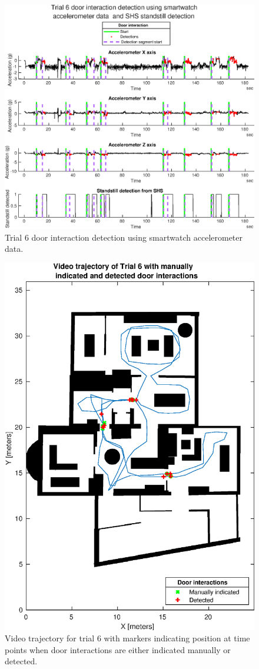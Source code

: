 \begin{figure}[H]
	\centering
	\includegraphics[width=0.8\linewidth]{images/20201201_1506_Trial_6_door_interaction_detection_using_smartwatch_1}
	\setlength{\belowcaptionskip}{-20pt}
	\caption{Trial 6 door interaction detection using smartwatch accelerometer data.}
	\label{fig:202011292141trial6doorinteractiondetectionusingsmartwatch1}
\end{figure}
\begin{figure}[H]
	\centering
	\includegraphics[width=0.7\linewidth]{images/20201129_2332_video_traj_Trial_6_door_detect_vs_manual_1}
	\setlength{\belowcaptionskip}{-20pt}
	\caption{Video trajectory for trial 6 with markers indicating position at time points when door interactions are either indicated manually or detected.}
	\label{fig:202011292332videotrajtrial6doordetectvsmanual1}
\end{figure}

